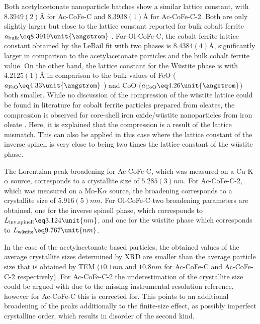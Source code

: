 \documentclass[\main/dresen_thesis.tex]{subfiles}
\begin{document}
    Both acetylacetonate nanoparticle batches show a similar lattice constant, with $8.3949(2) \unit{\angstrom}$ for Ac-CoFe-C and $8.3938(1) \unit{\angstrom}$ for Ac-CoFe-C-2.
    Both are only slightly larger but close to the lattice constant reported for bulk cobalt ferrite $a_\mathrm{bulk} \eq 8.3919 \unit{\angstrom}$ \cite{Stein_2018_Struct}.
    For Ol-CoFe-C, the cobalt ferrite lattice constant obtained by the LeBail fit with two phases is $8.4384(4) \unit{\angstrom}$, significantly larger in comparison to the acetylacetonate particles and the bulk cobalt ferrite value.
    On the other hand, the lattice constant for the W\"ustite phase is with $4.2125(1) \unit{\angstrom}$ in comparison to the bulk values of FeO ($a_\mathrm{FeO} \eq 4.33 \unit{\angstrom}$ \cite{Hentschel_1970_Stoich}) and CoO ($a_\mathrm{CoO} \eq 4.26 \unit{\angstrom}$) both smaller.
    While no discussion of the compression of the w\"ustite lattice could be found in literature for cobalt ferrite particles prepared from oleates, the compression is observed for core-shell iron oxide/w\"ustite nanoparticles from iron oleate  \cite{Wetterskog_2013_Anoma}.
    Here, it is explained that the compression is a result of the lattice mismatch.
    This can also be applied in this case where the lattice constant of the inverse spinell is very close to being two times the lattice constant of the w\"ustite phase.

    The Lorentzian peak broadening for Ac-CoFe-C, which was measured on a Cu-K$\alpha$ source, corresponds to a crystallite size of $5.285(3) \unit{nm}$.
    For Ac-CoFe-C-2, which was measured on a Mo-K$\alpha$ source, the broadening corresponds to a crystallite size of $5.916(5) \unit{nm}$.
    For Ol-CoFe-C two broadening parameters are obtained, one for the inverse spinell phase, which corresponds to $L_{\mathrm{inv. spinell}} \eq 3.124 \unit{nm}$, and one for the w\"ustite phase which corresponds to $L_{\textsf{w\"ustite}} \eq 9.767 \unit{nm}$.

    In the case of the acetylacetonate based particles, the obtained values of the average crystallite sizes determined by XRD are smaller than the average particle size that is obtained by TEM ($10.1 \unit{nm}$ and $10.8 \unit{nm}$ for Ac-CoFe-C and Ac-CoFe-C-2 respectively).
    For Ac-CoFe-C-2 the underestimation of the crystallite size could be argued with due to the missing instrumental resolution reference, however for Ac-CoFe-C this is corrected for.
    This points to an additional broadening of the peaks additionally to the finite-size effect, as possibly imperfect crystalline order, which results in disorder of the second kind.
\end{document}
